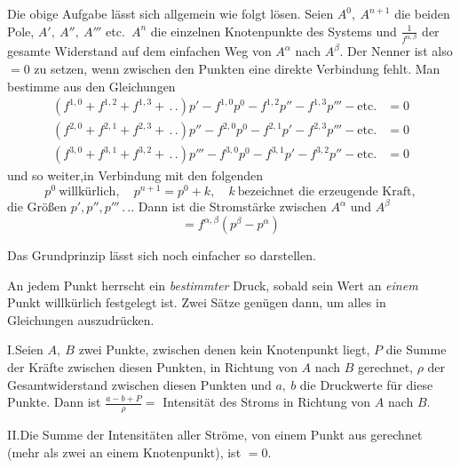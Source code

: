 \vspace{3mm}
Die obige Aufgabe lässt sich allgemein wie folgt lösen. Seien $A^0,\ A^{n+1}$ die beiden Pole, $A',\ A'',\ A'''$ etc.\ $A^n$ die einzelnen Knotenpunkte des Systems und $\frac{1}{f^{\alpha,\beta}}$ der gesamte Widerstand auf dem einfachen Weg von $A^\alpha$ nach $A^\beta$. Der Nenner ist also $=0$ zu setzen, wenn zwischen den Punkten eine direkte Verbindung fehlt. Man bestimme aus den Gleichungen
\[
\begin{aligned}
(f^{1,0}+f^{1,2}+f^{1,3}+\,.\,.)p'-f^{1,0}p^0-f^{1,2}p''-f^{1,3}p'''-\text{etc.}&=0\\
(f^{2,0}+f^{2,1}+f^{2,3}+\,.\,.)p''-f^{2,0}p^0-f^{2,1}p'-f^{2,3}p'''-\text{etc.}&=0\\
(f^{3,0}+f^{3,1}+f^{3,2}+\,.\,.)p'''-f^{3,0}p^0-f^{3,1}p'-f^{3,2}p''-\text{etc.}&=0
\end{aligned}
\]
und so weiter,\quad in Verbindung mit den folgenden
\[
p^0\ \text{willkürlich},\quad p^{n+1}=p^0+k,\quad k\ \text{bezeichnet die erzeugende Kraft},
\]
die Größen $p',p'',p'''\,.\,.$. Dann ist die Stromstärke zwischen $A^\alpha$ und $A^\beta$
\[
=f^{\alpha,\beta}(p^\beta-p^\alpha)
\]

\vspace{3mm}
Das Grundprinzip lässt sich noch einfacher so darstellen.

An jedem Punkt herrscht ein \textit{bestimmter} Druck, sobald sein Wert an \textit{einem} Punkt willkürlich festgelegt ist. Zwei Sätze genügen dann, um alles in Gleichungen auszudrücken.

I.\quad Seien $A,\ B$ zwei Punkte, zwischen denen kein Knotenpunkt liegt, $P$ die Summe der Kräfte zwischen diesen Punkten, in Richtung von $A$ nach $B$ gerechnet, $\rho$ der Gesamtwiderstand zwischen diesen Punkten und $a,\ b$ die Druckwerte für diese Punkte. Dann ist $\frac{a-b+P}{\rho}=$ Intensität des Stroms in Richtung von $A$ nach $B$.

II.\quad Die Summe der Intensitäten aller Ströme, von einem Punkt aus gerechnet (mehr als zwei an einem Knotenpunkt), ist $=0$.


